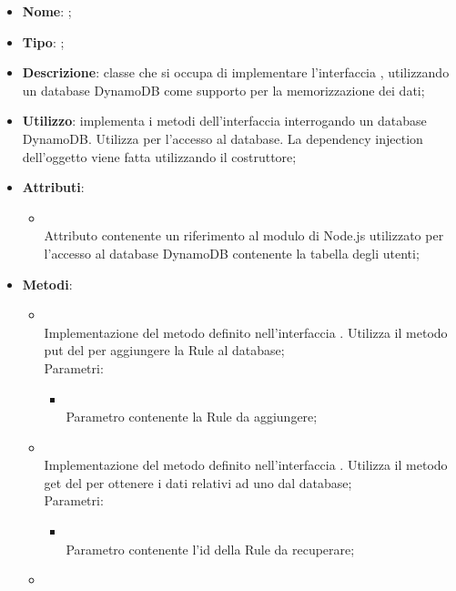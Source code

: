 \begin{itemize}
	\item \textbf{Nome}: ;
	\item \textbf{Tipo}: ;
	\item \textbf{Descrizione}: classe che si occupa di implementare l'interfaccia , utilizzando un database DynamoDB come supporto per la memorizzazione dei dati;
	\item \textbf{Utilizzo}: implementa i metodi dell'interfaccia  interrogando un database DynamoDB. Utilizza  per l'accesso al database. La dependency injection dell'oggetto  viene fatta utilizzando il costruttore;
	\item \textbf{Attributi}:
	\begin{itemize}
		\item[]  \\
		Attributo contenente un riferimento al modulo di Node.js utilizzato per l'accesso al database DynamoDB contenente la tabella degli utenti;
	\end{itemize}
	\item \textbf{Metodi}:
	\begin{itemize}
		\item[]  \\
		Implementazione del metodo definito nell'interfaccia . Utilizza il metodo put del  per aggiungere la Rule al database;\\
		Parametri:
		\begin{itemize}
			\item {} \\
			Parametro contenente la Rule da aggiungere;
		\end{itemize}
		\item[]  \\
		Implementazione del metodo definito nell'interfaccia . Utilizza il metodo get del  per ottenere i dati relativi ad uno  dal database;\\
		Parametri:
		\begin{itemize}
			\item {} \\
			Parametro contenente l'id della Rule da recuperare;
		\end{itemize}
		\item[]  \\

\end{itemize}
\end{itemize}

